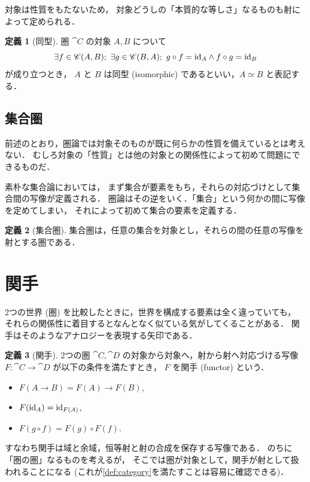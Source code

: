 \documentclass[titlepage]{ltjsreport}
\theoremstyle{definition}
\newtheorem{definition}{定義}[chapter]
\begin{document}
対象は性質をもたないため，
対象どうしの「本質的な等しさ」なるものも射によって定められる．

\begin{definition}[同型]
  圏 $\cat{C}$ の対象 $A,B$ について
  \begin{equation}
    \exists f\in\mathscr{C}(A,B);
    \ \exists g\in\mathscr{C}(B,A);
    \ g\circ f=\mathrm{id}_{A}\wedge f\circ g=\mathrm{id}_{B}
  \end{equation}
  が成り立つとき，
  $A$ と $B$ は同型 (isomorphic) であるといい，$A\simeq B$ と表記する．
\end{definition}

\subsection{集合圏}

前述のとおり，圏論では対象そのものが既に何らかの性質を備えているとは考えない．
むしろ対象の「性質」とは他の対象との関係性によって初めて問題にできるものだ．

素朴な集合論においては，
まず集合が要素をもち，それらの対応づけとして集合間の写像が定義される．
圏論はその逆をいく．「集合」という何かの間に写像を定めてしまい，
それによって初めて集合の要素を定義する．

\begin{definition}[集合圏]
  集合圏は，任意の集合を対象とし，それらの間の任意の写像を射とする圏である．
\end{definition}

\section{関手}

2つの世界 (圏) を比較したときに，世界を構成する要素は全く違っていても，
それらの関係性に着目するとなんとなく似ている気がしてくることがある．
関手はそのようなアナロジーを表現する矢印である．
\begin{definition}[関手]
  2つの圏 $\cat{C},\cat{D}$ の対象から対象へ，射から射へ対応づける写像
  $F:\cat{C}\to\cat{D}$ が以下の条件を満たすとき，
  $F$ を関手 (functor) という．
  \begin{itemize}
    \item $F(A\to B)=F(A)\to F(B)$,
    \item $F(\mathrm{id}_{A})=\mathrm{id}_{F(A)}$,
    \item $F(g\circ f)=F(g)\circ F(f)$.
  \end{itemize}
\end{definition}
すなわち関手は域と余域，恒等射と射の合成を保存する写像である．
のちに「圏の圏」なるものを考えるが，
そこでは圏が対象として，関手が射として扱われることになる
(これが\cref{def:category}を満たすことは容易に確認できる)．
\end{document}
